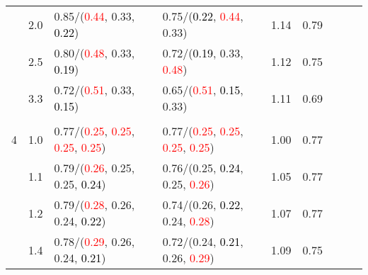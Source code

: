 \documentclass[10pt,a4paper]{report}
\begin{document}
\begin{table}[!htbp]
\begin{center}
{\begin{tabular}{ccllccccc}
				  & 2.0                               & 0.85/(\textcolor{red}{0.44}, 0.33, \textcolor{black}{0.22})                                       & 0.75/(\textcolor{black}{0.22}, \textcolor{red}{0.44}, 0.33)                                       & 1.14             & 0.79                     \\
				  & 2.5                               & 0.80/(\textcolor{red}{0.48}, 0.33, \textcolor{black}{0.19})                                       & 0.72/(\textcolor{black}{0.19}, 0.33, \textcolor{red}{0.48})                                       & 1.12             & 0.75                     \\
				  & 3.3                               & 0.72/(\textcolor{red}{0.51}, 0.33, \textcolor{black}{0.15})                                       & 0.65/(\textcolor{red}{0.51}, \textcolor{black}{0.15}, 0.33)                                       & 1.11             & 0.69                     \\
				  &                                   &                                                                                                   &                                                                                                   &                                             \\
				4 & 1.0                               & 0.77/(\textcolor{red}{0.25}, \textcolor{red}{0.25}, \textcolor{red}{0.25}, \textcolor{red}{0.25}) & 0.77/(\textcolor{red}{0.25}, \textcolor{red}{0.25}, \textcolor{red}{0.25}, \textcolor{red}{0.25}) & 1.00             & 0.77                     \\
				  & 1.1                               & 0.79/(\textcolor{red}{0.26}, 0.25, 0.25, \textcolor{black}{0.24})                                 & 0.76/(0.25, \textcolor{black}{0.24}, 0.25, \textcolor{red}{0.26})                                 & 1.05             & 0.77                     \\
				  & 1.2                               & 0.79/(\textcolor{red}{0.28}, 0.26, 0.24, \textcolor{black}{0.22})                                 & 0.74/(0.26, \textcolor{black}{0.22}, 0.24, \textcolor{red}{0.28})                                 & 1.07             & 0.77                     \\
				  & 1.4                               & 0.78/(\textcolor{red}{0.29}, 0.26, 0.24, \textcolor{black}{0.21})                                 & 0.72/(0.24, \textcolor{black}{0.21}, 0.26, \textcolor{red}{0.29})                                 & 1.09             & 0.75                     \\

\end{tabular}}
\end{center}
\end{table}
\end{document}
